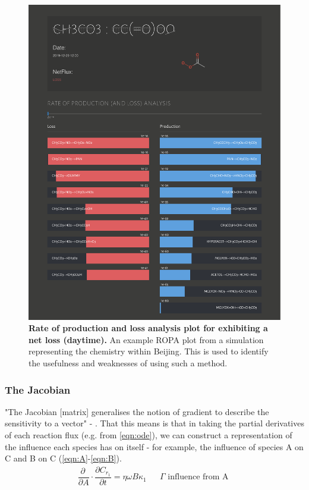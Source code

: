 \begin{figure}[H]
     \centering
         \includegraphics[width=\textwidth]{figures/ROPA_CH3CO3.pdf}
        \caption{\textbf{Rate of production and loss analysis plot for  exhibiting a net loss (daytime).} An example ROPA plot from a simulation representing the chemistry within Beijing. This is used to identify the usefulness and weaknesses of using such a method.}
        \label{fig:ropa_day}
\end{figure}
\newpage



\subsubsection{The Jacobian}
"The Jacobian [matrix] generalises the notion of gradient to describe the sensitivity to a vector" - \cite{jacob}. That this means is that in taking the partial derivatives of each reaction flux (e.g. from \autoref{eqn:ode}), we can construct a representation of the influence each species has on itself - for example, the influence of species A on C and B on C (\autoref{eqn:A}-\ref{eqn:B}). 
\begin{eqnarray}
   \dfrac{\partial \ }{\partial A}\cdot \dfrac{\partial C_{r_1}}{\partial t} = \eta \omega B \kappa_1 & & \Gamma \text{ influence from A }\label{eqn:A}%
\end{eqnarray}
    
